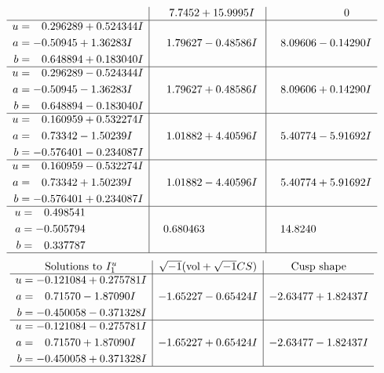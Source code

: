 \documentclass[1p]{elsarticle_modified}
\theoremstyle{definition}
\newcommand{\I}{\sqrt{-1}}
\begin{document}
$$\begin{array}{c|c|c}
 & \phantom{-}7.7452 + 15.9995 I & \phantom{-0.000000 } 0 \\ \hline\begin{aligned}
u &= \phantom{-}0.296289 + 0.524344 I \\
a &= -0.50945 + 1.36283 I \\
b &= \phantom{-}0.648894 + 0.183040 I\end{aligned}
 & \phantom{-}1.79627 - 0.48586 I & \phantom{-}8.09606 - 0.14290 I \\ \hline\begin{aligned}
u &= \phantom{-}0.296289 - 0.524344 I \\
a &= -0.50945 - 1.36283 I \\
b &= \phantom{-}0.648894 - 0.183040 I\end{aligned}
 & \phantom{-}1.79627 + 0.48586 I & \phantom{-}8.09606 + 0.14290 I \\ \hline\begin{aligned}
u &= \phantom{-}0.160959 + 0.532274 I \\
a &= \phantom{-}0.73342 - 1.50239 I \\
b &= -0.576401 - 0.234087 I\end{aligned}
 & \phantom{-}1.01882 + 4.40596 I & \phantom{-}5.40774 - 5.91692 I \\ \hline\begin{aligned}
u &= \phantom{-}0.160959 - 0.532274 I \\
a &= \phantom{-}0.73342 + 1.50239 I \\
b &= -0.576401 + 0.234087 I\end{aligned}
 & \phantom{-}1.01882 - 4.40596 I & \phantom{-}5.40774 + 5.91692 I \\ \hline\begin{aligned}
u &= \phantom{-}0.498541\phantom{ +0.000000I} \\
a &= -0.505794\phantom{ +0.000000I} \\
b &= \phantom{-}0.337787\phantom{ +0.000000I}\end{aligned}
 & \phantom{-}0.680463\phantom{ +0.000000I} & \phantom{-}14.8240\phantom{ +0.000000I}\\
 \hline 
 \end{array}$$\newpage$$\begin{array}{c|c|c}  
\text{Solutions to }I^u_{1}& \I (\text{vol} + \sqrt{-1}CS) & \text{Cusp shape}\\
 \hline 
\begin{aligned}
u &= -0.121084 + 0.275781 I \\
a &= \phantom{-}0.71570 - 1.87090 I \\
b &= -0.450058 - 0.371328 I\end{aligned}
 & -1.65227 - 0.65424 I & -2.63477 + 1.82437 I \\ \hline\begin{aligned}
u &= -0.121084 - 0.275781 I \\
a &= \phantom{-}0.71570 + 1.87090 I \\
b &= -0.450058 + 0.371328 I\end{aligned}
 & -1.65227 + 0.65424 I & -2.63477 - 1.82437 I\\
 \hline 
 \end{array}$$\newpage\newpage\renewcommand{\arraystretch}{1}
\end{document}
